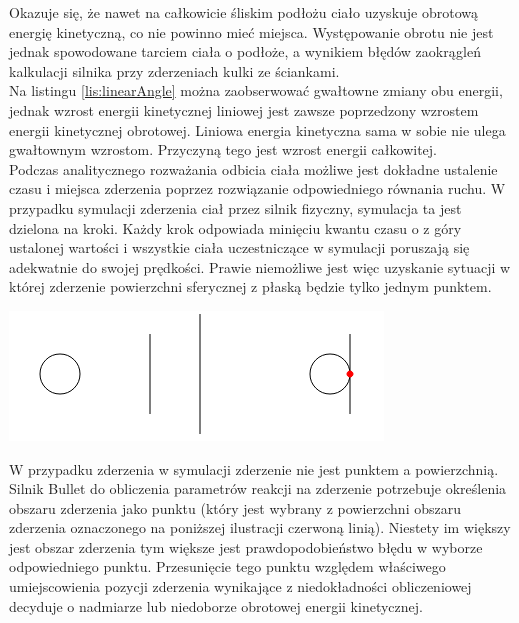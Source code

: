 

Okazuje się, że nawet na całkowicie śliskim podłożu ciało uzyskuje obrotową
energię kinetyczną, co nie powinno mieć miejsca. Występowanie obrotu nie jest
jednak spowodowane tarciem ciała o podłoże, a wynikiem błędów zaokrągleń
kalkulacji silnika przy zderzeniach kulki ze ściankami.\\
Na listingu \ref{lis:linearAngle} można zaobserwować gwałtowne zmiany obu
energii, jednak wzrost energii kinetycznej liniowej jest zawsze poprzedzony
wzrostem energii kinetycznej obrotowej. Liniowa energia kinetyczna sama w sobie
nie ulega gwałtownym wzrostom. Przyczyną tego jest wzrost energii całkowitej.\\
Podczas analitycznego rozważania odbicia ciała możliwe jest dokładne ustalenie
czasu i miejsca zderzenia poprzez rozwiązanie odpowiedniego równania ruchu. W
przypadku symulacji zderzenia ciał przez silnik fizyczny, symulacja ta jest
dzielona na kroki. Każdy krok odpowiada minięciu kwantu czasu o z góry ustalonej
wartości i wszystkie ciała uczestniczące w symulacji poruszają się adekwatnie do
swojej prędkości. Prawie niemożliwe jest więc uzyskanie sytuacji w której
zderzenie powierzchni sferycznej z płaską będzie tylko jednym punktem.

\begin{center}
\includegraphics{./img/zderzenie1.png}
\end{center}

W przypadku zderzenia w symulacji zderzenie nie jest punktem a powierzchnią.
Silnik Bullet do obliczenia parametrów reakcji na zderzenie potrzebuje
określenia obszaru zderzenia jako punktu (który jest wybrany z powierzchni
obszaru zderzenia oznaczonego na poniższej ilustracji czerwoną linią). Niestety
im większy jest obszar zderzenia tym większe jest prawdopodobieństwo błędu w
wyborze odpowiedniego punktu. Przesunięcie tego punktu względem właściwego
umiejscowienia pozycji zderzenia wynikające z niedokładności obliczeniowej
decyduje o nadmiarze lub niedoborze obrotowej energii kinetycznej.

